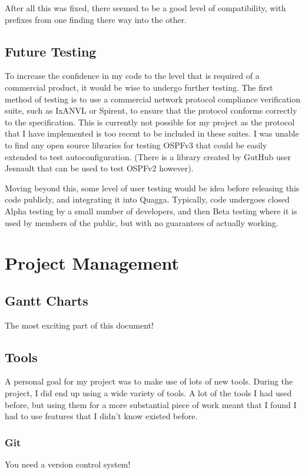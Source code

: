 \documentclass[12pt]{report}
\begin{document}
After all this was fixed, there seemed to be a good level of compatibility,
with prefixes from one finding there way into the other.

\section{Future Testing}
To increase the confidence in my code to the level that is required of a
commercial product, it would be wise to undergo further testing. The first
method of testing is to use a commercial network protocol compliance
verification suite, such as IxANVL or Spirent, to ensure that the protocol
conforms correctly to the specification. This is currently not possible for my
project as the protocol that I have implemented is too recent to be included in
these suites. I was unable to find any open source libraries for testing OSPFv3
that could be easily extended to test autoconfiguration. (There is a library
created by GutHub user Jesnault that can be used to test OSPFv2 however).

Moving beyond this, some level of user testing would be idea before releasing
this code publicly, and integrating it into Quagga. Typically, code undergoes
closed Alpha testing by a small number of developers, and then Beta testing
where it is used by members of the public, but with no guarantees of actually
working.

\chapter{Project Management}

\section{Gantt Charts}
The most exciting part of this document!

\section{Tools}
A personal goal for my project was to make use of lots of new tools. During the
project, I did end up using a wide variety of tools. A lot of the tools I had
used before, but using them for a more substantial piece of work meant that I
found I had to use features that I didn't know existed before.

\subsection{Git}
You need a version control system!
\end{document}

